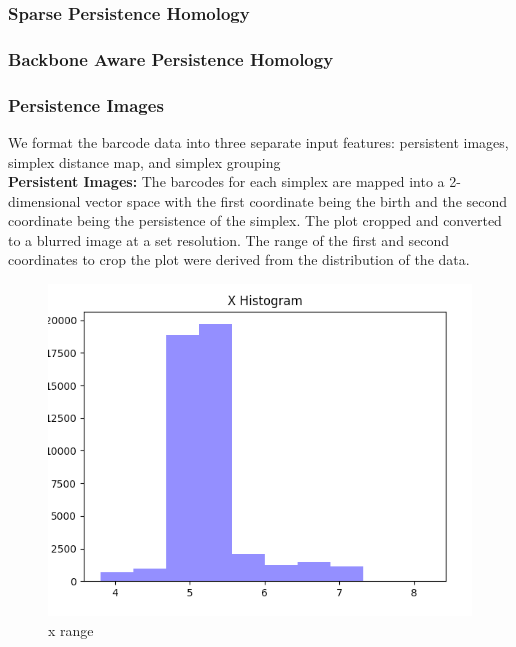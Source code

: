 \documentclass[12pt, a4paper, twocolumn, fullpage]{article}
\theoremstyle{plain}
\theoremstyle{definition}
\theoremstyle{remark}
\begin{document}
\subsubsection{ Sparse Persistence Homology}
\subsubsection{ Backbone Aware Persistence Homology}
\subsubsection{ Persistence Images}
We format the barcode data into three separate input features: persistent images, simplex distance map, and simplex grouping
\\
\textbf{Persistent Images:} The barcodes for each simplex are mapped into a 2-dimensional vector space with the first coordinate being the birth and the second coordinate being the persistence of the simplex. The plot cropped and converted to a blurred image at a set resolution. The range of the first and second coordinates to crop the plot were derived from the distribution of the data.

\begin{figure}
	\includegraphics[width=\linewidth]{xhist.png}
	\caption{x range}
	\label{fig:boat1}
\end{figure}
\end{document}
